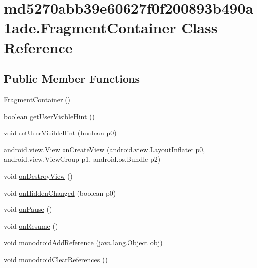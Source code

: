 \hypertarget{classmd5270abb39e60627f0f200893b490a1ade_1_1_fragment_container}{
\section{md5270abb39e60627f0f200893b490a1ade.FragmentContainer Class Reference}
\label{classmd5270abb39e60627f0f200893b490a1ade_1_1_fragment_container}
}
\subsection*{Public Member Functions}
\begin{CompactItemize}
\item 
\hyperlink{classmd5270abb39e60627f0f200893b490a1ade_1_1_fragment_container_09060a337c87c0a01b05851c90d3083f}{FragmentContainer} ()
\item 
boolean \hyperlink{classmd5270abb39e60627f0f200893b490a1ade_1_1_fragment_container_12e358ed77c28754294edfcfb9521d82}{getUserVisibleHint} ()
\item 
void \hyperlink{classmd5270abb39e60627f0f200893b490a1ade_1_1_fragment_container_f6e299d60e20e44f0e949f3497fd345b}{setUserVisibleHint} (boolean p0)
\item 
android.view.View \hyperlink{classmd5270abb39e60627f0f200893b490a1ade_1_1_fragment_container_38270e68e1d2d7f70373ca9c82a31f3f}{onCreateView} (android.view.LayoutInflater p0, android.view.ViewGroup p1, android.os.Bundle p2)
\item 
void \hyperlink{classmd5270abb39e60627f0f200893b490a1ade_1_1_fragment_container_4d7e667cd11efc3b3a5cb5d2e17dda1d}{onDestroyView} ()
\item 
void \hyperlink{classmd5270abb39e60627f0f200893b490a1ade_1_1_fragment_container_51729a9d69add152b7b1e0f6270db36c}{onHiddenChanged} (boolean p0)
\item 
void \hyperlink{classmd5270abb39e60627f0f200893b490a1ade_1_1_fragment_container_d857beb53f208f2c494e78fec52c61e3}{onPause} ()
\item 
void \hyperlink{classmd5270abb39e60627f0f200893b490a1ade_1_1_fragment_container_f6db9cb141d90e44e3cc57d33a3e7ce3}{onResume} ()
\item 
void \hyperlink{classmd5270abb39e60627f0f200893b490a1ade_1_1_fragment_container_a20e0e8c51af1976fdfbfe10e351fb04}{monodroidAddReference} (java.lang.Object obj)
\item 
void \hyperlink{classmd5270abb39e60627f0f200893b490a1ade_1_1_fragment_container_edf1e2fba19c8c5c3ab497d9ef62e0cd}{monodroidClearReferences} ()
\end{CompactItemize}
